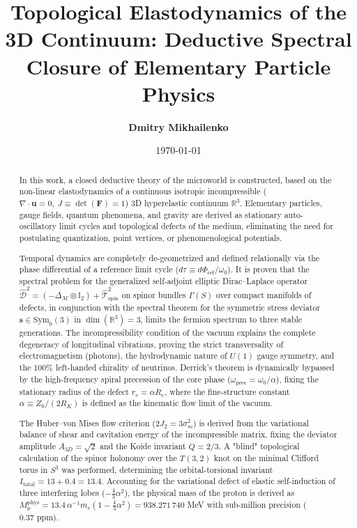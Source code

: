 \documentclass[12pt,a4paper]{article}
\title{\textbf{Topological Elastodynamics of the 3D Continuum: Deductive Spectral Closure of Elementary Particle Physics}}
\author{\textbf{Dmitry Mikhailenko}}
\date{\today}
\begin{document}
	
	\maketitle
	
	\begin{abstract}
		In this work, a closed deductive theory of the microworld is constructed, based on the non-linear elastodynamics of a continuous isotropic incompressible ($\nabla \cdot \mathbf{u} = 0, \ J \equiv \det(\mathbf{F}) = 1$) 3D hyperelastic continuum $\mathbb{R}^3$. Elementary particles, gauge fields, quantum phenomena, and gravity are derived as stationary auto-oscillatory limit cycles and topological defects of the medium, eliminating the need for postulating quantization, point vertices, or phenomenological potentials.
		
		Temporal dynamics are completely de-geometrized and defined relationally via the phase differential of a reference limit cycle ($d\tau \equiv d\Phi_{\text{ref}}/\omega_0$). It is proven that the spectral problem for the generalized self-adjoint elliptic Dirac--Laplace operator $\hat{\mathcal{D}}^2 = (-\Delta_{\mathcal{M}} \otimes \mathbb{I}_2) + \hat{\mathcal{T}}_{\text{spin}}^2$ on spinor bundles $\Gamma(S)$ over compact manifolds of defects, in conjunction with the spectral theorem for the symmetric stress deviator $\mathbf{s} \in \mathrm{Sym}_0(3)$ in $\dim(\mathbb{R}^3) = 3$, limits the fermion spectrum to three stable generations. The incompressibility condition of the vacuum explains the complete degeneracy of longitudinal vibrations, proving the strict transversality of electromagnetism (photons), the hydrodynamic nature of $U(1)$ gauge symmetry, and the 100\% left-handed chirality of neutrinos. Derrick's theorem is dynamically bypassed by the high-frequency spiral precession of the core phase ($\omega_{\text{prec}} = \omega_0 / \alpha$), fixing the stationary radius of the defect $r_e = \alpha R_e$, where the fine-structure constant $\alpha \equiv Z_0 / (2R_K)$ is defined as the kinematic flow limit of the vacuum.
		
		The Huber--von Mises flow criterion ($2J_2 = 3\sigma_m^2$) is derived from the variational balance of shear and cavitation energy of the incompressible matrix, fixing the deviator amplitude $A_{3D} = \sqrt{2}$ and the Koide invariant $Q = 2/3$. A "blind" topological calculation of the spinor holonomy over the $T(3,2)$ knot on the minimal Clifford torus in $S^3$ was performed, determining the orbital-torsional invariant $I_{\text{total}} = 13 + 0.4 = 13.4$. Accounting for the variational defect of elastic self-induction of three interfering lobes ($-\frac{4}{3}\alpha^2$), the physical mass of the proton is derived as $M_p^{\text{phys}} = 13.4 \, \alpha^{-1} m_e (1 - \frac{4}{3}\alpha^2) = 938.271\,740$ MeV with sub-million precision ($0.37 \text{ ppm}$).
		

\end{abstract}
\end{document}
